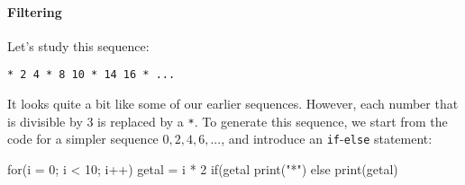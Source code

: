 \paragraph{Filtering}

Let's study this sequence:

\begin{verbatim}
* 2 4 * 8 10 * 14 16 * ...
\end{verbatim}

It looks quite a bit like some of our earlier sequences. However, each number that is divisible by 3 is replaced by a \texttt{*}. To generate this sequence, we start from the code for a simpler sequence $0, 2, 4, 6, ...$, and introduce an \texttt{if}-\texttt{else} statement:

\begin{nnflisting}
for(i = 0; i < 10; i++)
    getal = i * 2
    if(getal %
        print("*")
    else
        print(getal)
\end{nnflisting}


%
%






